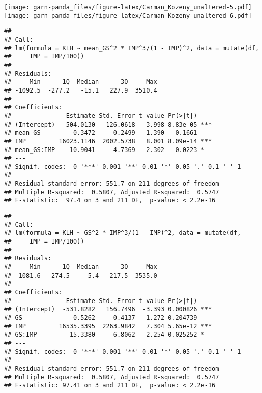 \documentclass[]{article}
\begin{document}
\texttt{[image: garn-panda\_files/figure-latex/Carman\_Kozeny\_unaltered-5.pdf]}
\texttt{[image: garn-panda\_files/figure-latex/Carman\_Kozeny\_unaltered-6.pdf]}

\begin{verbatim}
## 
## Call:
## lm(formula = KLH ~ mean_GS^2 * IMP^3/(1 - IMP)^2, data = mutate(df, 
##     IMP = IMP/100))
## 
## Residuals:
##     Min      1Q  Median      3Q     Max 
## -1092.5  -277.2   -15.1   227.9  3510.4 
## 
## Coefficients:
##               Estimate Std. Error t value Pr(>|t|)    
## (Intercept)  -504.0130   126.0618  -3.998 8.83e-05 ***
## mean_GS         0.3472     0.2499   1.390   0.1661    
## IMP         16023.1146  2002.5738   8.001 8.09e-14 ***
## mean_GS:IMP   -10.9041     4.7369  -2.302   0.0223 *  
## ---
## Signif. codes:  0 '***' 0.001 '**' 0.01 '*' 0.05 '.' 0.1 ' ' 1
## 
## Residual standard error: 551.7 on 211 degrees of freedom
## Multiple R-squared:  0.5807, Adjusted R-squared:  0.5747 
## F-statistic:  97.4 on 3 and 211 DF,  p-value: < 2.2e-16
\end{verbatim}

\begin{verbatim}
## 
## Call:
## lm(formula = KLH ~ GS^2 * IMP^3/(1 - IMP)^2, data = mutate(df, 
##     IMP = IMP/100))
## 
## Residuals:
##     Min      1Q  Median      3Q     Max 
## -1081.6  -274.5    -5.4   217.5  3535.0 
## 
## Coefficients:
##               Estimate Std. Error t value Pr(>|t|)    
## (Intercept)  -531.8282   156.7496  -3.393 0.000826 ***
## GS              0.5262     0.4137   1.272 0.204739    
## IMP         16535.3395  2263.9842   7.304 5.65e-12 ***
## GS:IMP        -15.3380     6.8062  -2.254 0.025252 *  
## ---
## Signif. codes:  0 '***' 0.001 '**' 0.01 '*' 0.05 '.' 0.1 ' ' 1
## 
## Residual standard error: 551.7 on 211 degrees of freedom
## Multiple R-squared:  0.5807, Adjusted R-squared:  0.5747 
## F-statistic: 97.41 on 3 and 211 DF,  p-value: < 2.2e-16
\end{verbatim}
\end{document}
